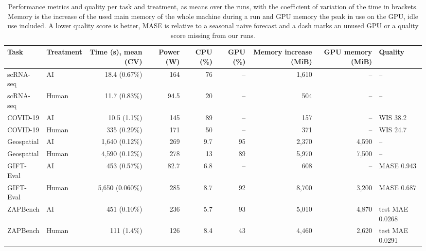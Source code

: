 \begin{table}[ht]
\centering
\caption{Performance metrics and quality per task and treatment, as means over the runs, with the coefficient of variation of the time in brackets. Memory is the increase of the used main memory of the whole machine during a run and GPU memory the peak in use on the GPU, idle use included. A lower quality score is better, MASE is relative to a seasonal naive forecast and a dash marks an unused GPU or a quality score missing from our runs.} 
\label{tab:08_descriptives_performance}
\begingroup\small
\begin{tabular}{llrrrrrrl}
  \toprule
Task & Treatment & Time (s), mean (CV) & Power (W) & CPU (\%) & GPU (\%) & Memory increase (MiB) & GPU memory (MiB) & Quality \\ 
  \midrule
scRNA-seq & AI & 18.4 (0.67\%) & 164 & 76 & – & 1,610 & – & – \\ 
  scRNA-seq & Human & 11.7 (0.83\%) & 94.5 & 20 & – & 504 & – & – \\ 
  COVID-19 & AI & 10.5 (1.1\%) & 145 & 89 & – & 157 & – & WIS 38.2 \\ 
  COVID-19 & Human & 335 (0.29\%) & 171 & 50 & – & 371 & – & WIS 24.7 \\ 
  Geospatial & AI & 1,640 (0.12\%) & 269 & 9.7 & 95 & 2,370 & 4,590 & – \\ 
  Geospatial & Human & 4,590 (0.12\%) & 278 & 13 & 89 & 5,970 & 7,500 & – \\ 
  GIFT-Eval & AI & 453 (0.57\%) & 82.7 & 6.8 & – & 608 & – & MASE 0.943 \\ 
  GIFT-Eval & Human & 5,650 (0.060\%) & 285 & 8.7 & 92 & 8,700 & 3,200 & MASE 0.687 \\ 
  ZAPBench & AI & 451 (0.10\%) & 236 & 5.7 & 93 & 5,010 & 4,870 & test MAE 0.0268 \\ 
  ZAPBench & Human & 111 (1.4\%) & 126 & 8.4 & 43 & 4,460 & 2,620 & test MAE 0.0291 \\ 
   \bottomrule
\end{tabular}
\endgroup
\end{table}
